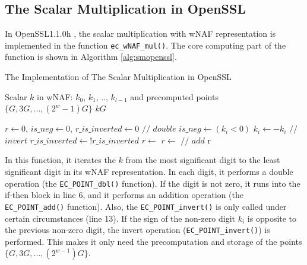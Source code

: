 %
\subsection{The Scalar Multiplication in OpenSSL}
\label{intro_smulinssl}
In OpenSSL1.1.0h \cite{openssl}, the scalar multiplication with wNAF representation is implemented in the function \verb+ec_wNAF_mul()+.
The core computing part of the function is shown in Algorithm  \ref{alg:smopenssl}.

\renewcommand{\algorithmicrequire}{\textbf{Input:}}
\renewcommand{\algorithmicensure}{\textbf{Output:}}

\begin{algorithm}[t]
        \caption{The Implementation of The Scalar Multiplication in OpenSSL}
        \label{alg:smopenssl}
        \begin{algorithmic}[1]
            \Require Scalar $k$ in wNAF: $k_0$, $k_1$, .., $k_{l-1}$ and precomputed points $\{G, 3G, ..., (2^{w} - 1)G\}$
            \Ensure $kG$
			
			\State $r \gets 0$, $is\_neg \gets 0$, $r\_is\_inverted \gets 0$
            		\State {}     {   }  $//$ $double$
                \EndIf
                	\State $is\_neg \gets (k_i < 0)$
                		\State $k_i \gets -k_i$
                	\EndIf
                			\State {}   {   }  $//$ $invert$
                		\EndIf                	
                    	\State $r\_is\_inverted \gets !r\_is\_inverted$
                	\EndIf
                		\State $r \gets $ 
                	\Else
                		\State $r \gets $  {   }  $//$   $add$
                	\EndIf
                \EndIf
            \EndFor
            \State \Return r
        \end{algorithmic}
\end{algorithm}

In this function, it iterates the $k$ from the most significant digit to the least significant digit in its wNAF representation.
 In each digit, it performs a double operation (the \verb+EC_POINT_dbl()+ function).
  If the digit is not zero, it runs into the if-then block in line 6, and it  performs an addition operation (the \verb+EC_POINT_add()+ function).
Also, the \verb+EC_POINT_invert()+ is only called under certain circumstances (line 13).
If the sign of the non-zero digit $k_i$ is opposite to the previous  non-zero digit, the invert operation (\verb+EC_POINT_invert()+) is performed.
This makes it only need the precomputation and storage of the points $\{G, 3G, ..., (2^{w - 1})G\}$.

